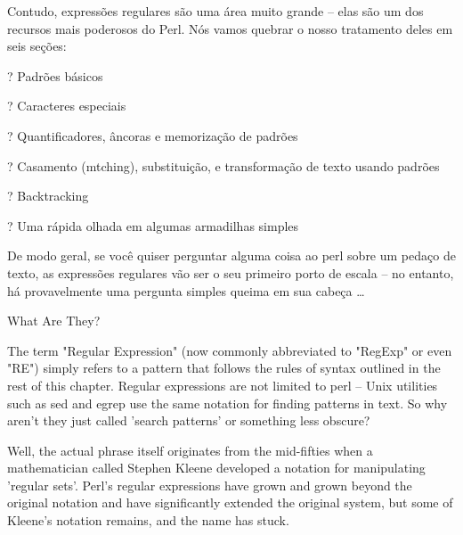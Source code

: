 \documentclass[a4paper,11pt]{book}
\begin{document}
\noindent 

\noindent Contudo, expressões regulares são uma área muito grande -- elas são um dos recursos mais poderosos do Perl.
Nós vamos quebrar o nosso tratamento deles em seis seções: 

\noindent 

\noindent ? Padrões básicos

\noindent 

\noindent ? Caracteres especiais

\noindent 

\noindent ? Quantificadores, âncoras e memorização de padrões

\noindent 

\noindent ? Casamento (mtching), substituição, e transformação de texto usando padrões

\noindent 

\noindent ? Backtracking

\noindent 

\noindent ? Uma rápida olhada em algumas armadilhas simples

\noindent 

\noindent De modo geral, se você quiser perguntar alguma coisa ao perl sobre um pedaço de texto, as expressões regulares
vão ser o seu primeiro porto de escala -- no entanto, há provavelmente uma pergunta simples queima em sua cabeça
\dots 

\noindent  

\noindent  

\noindent  

\noindent  

\noindent 

\noindent 

\noindent What Are They?

\noindent 

\noindent The term "Regular Expression" (now commonly abbreviated to "RegExp" or even "RE") simply refers to a pattern that follows the rules of syntax outlined in the rest of this chapter. Regular expressions are not limited to perl -- Unix utilities such as sed and egrep use the same notation for finding patterns in text. So why aren't they just called 'search patterns' or something less obscure?

\noindent 

\noindent Well, the actual phrase itself originates from the mid-fifties when a mathematician called Stephen Kleene developed a notation for manipulating 'regular sets'. Perl's regular expressions have grown and grown beyond the original notation and have significantly extended the original system, but some of Kleene's notation remains, and the name has stuck.
\end{document}

